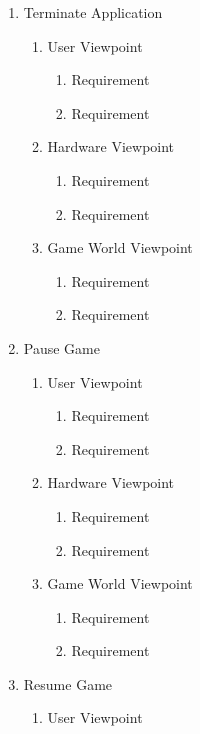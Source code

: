 \documentclass[]{article}
\begin{document}
\begin{enumerate}[{BE}1.]
\begin{enumerate}[{VP1}.1]
	\end{enumerate}
	\item Terminate Application
	\begin{enumerate}[{VP2}.1]
	\item User Viewpoint
			\begin{enumerate}
				\item Requirement
				\item Requirement
			\end{enumerate}
		\item Hardware Viewpoint
			\begin{enumerate}
				\item Requirement
				\item Requirement
			\end{enumerate}
		\item Game World Viewpoint
			\begin{enumerate}
				\item Requirement
				\item Requirement
			\end{enumerate}
	\end{enumerate}
		\item Pause Game
	\begin{enumerate}[{VP3}.1]
		\item User Viewpoint
			\begin{enumerate}
				\item Requirement
				\item Requirement
			\end{enumerate}
		\item Hardware Viewpoint
			\begin{enumerate}
				\item Requirement
				\item Requirement
			\end{enumerate}
		\item Game World Viewpoint
			\begin{enumerate}
				\item Requirement
				\item Requirement
			\end{enumerate}
	\end{enumerate}
		\item Resume Game
	\begin{enumerate}[{VP4}.1]
		\item User Viewpoint

\end{enumerate}
\end{enumerate}
\end{document}
